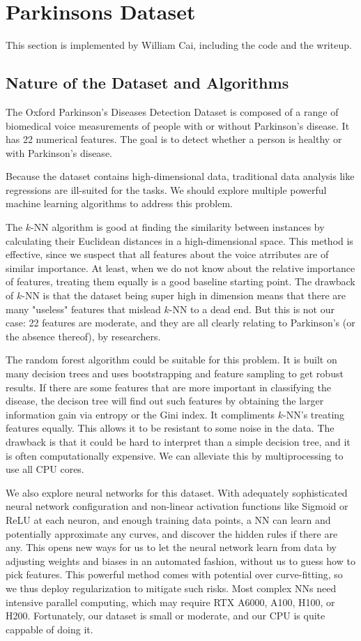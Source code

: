 \section{Parkinsons Dataset}
This section is implemented by William Cai, including the code and the writeup. 

\subsection{Nature of the Dataset and Algorithms   }

The Oxford Parkinson's Diseases Detection Dataset is composed of a range of biomedical voice
measurements of people with or without Parkinson's disease.
It has 22 numerical features.
The goal is to detect whether a person is healthy or with Parkinson's disease.

Because the dataset contains high-dimensional data, traditional data analysis like regressions are
ill-suited for the tasks.
We should explore multiple powerful machine learning algorithms to address this problem.

The $k$-NN algorithm is good at finding the similarity between instances by calculating their
Euclidean distances in a high-dimensional space.
This method is effective, since we suspect that all features about the voice atrributes are of
similar importance.
At least, when we do not know about the relative importance of features, treating them equally is a
good baseline starting point.
The drawback of $k$-NN is that the dataset being super high in dimension means that there are many
"useless" features that mislead $k$-NN to a dead end.
But this is not our case: 22 features are moderate, and they are all clearly relating to Parkinson's
(or the absence thereof), by researchers.

The random forest algorithm could be suitable for this problem.
It is built on many decision trees and uses bootstrapping and feature sampling to get robust
results.
If there are some features that are more important in classifying the disease, the decison tree will
find out such features by obtaining the larger information gain via entropy or the Gini index.
It compliments $k$-NN's treating features equally.
This allows it to be resistant to some noise in the data.
The drawback is that it could be hard to interpret than a simple decision tree, and it is often
computationally expensive.
We can alleviate this by multiprocessing to use all CPU cores.

We also explore neural networks for this dataset.
With adequately sophisticated neural network configuration and non-linear activation functions like
Sigmoid or ReLU at each neuron, and enough training data points, a NN can learn and potentially
approximate any curves, and discover the hidden rules if there are any.
This opens new ways for us to let the neural network learn from data by adjusting weights and biases
in an automated fashion, without us to guess how to pick features.
This powerful method comes with potential over curve-fitting, so we thus deploy regularization to
mitigate such risks.
Most complex NNs need intensive parallel computing, which may require RTX A6000, A100, H100, or
H200.
Fortunately, our dataset is small or moderate, and our CPU is quite cappable of doing it.

